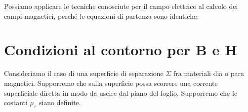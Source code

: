 Possiamo applicare le tecniche conosciute per il campo elettrico al calcolo dei campi magnetici, perché le equazioni di partenza sono identiche.

\section{Condizioni al contorno per B e H}

Consideriamo il caso di una superficie di separazione $\Sigma$ fra materiali dia o para magnetici. Supporremo che sulla superficie possa scorrere una corrente superficiale diretta in modo da uscire dal piano del foglio. Supporremo che le costanti $\mu_r$ siano definite.

\begin{figure}[htpb]
	\centering


	\begin{tikzpicture}[x=0.75pt,y=0.75pt,yscale=-0.8,xscale=0.8]


\end{tikzpicture}
\end{figure}
